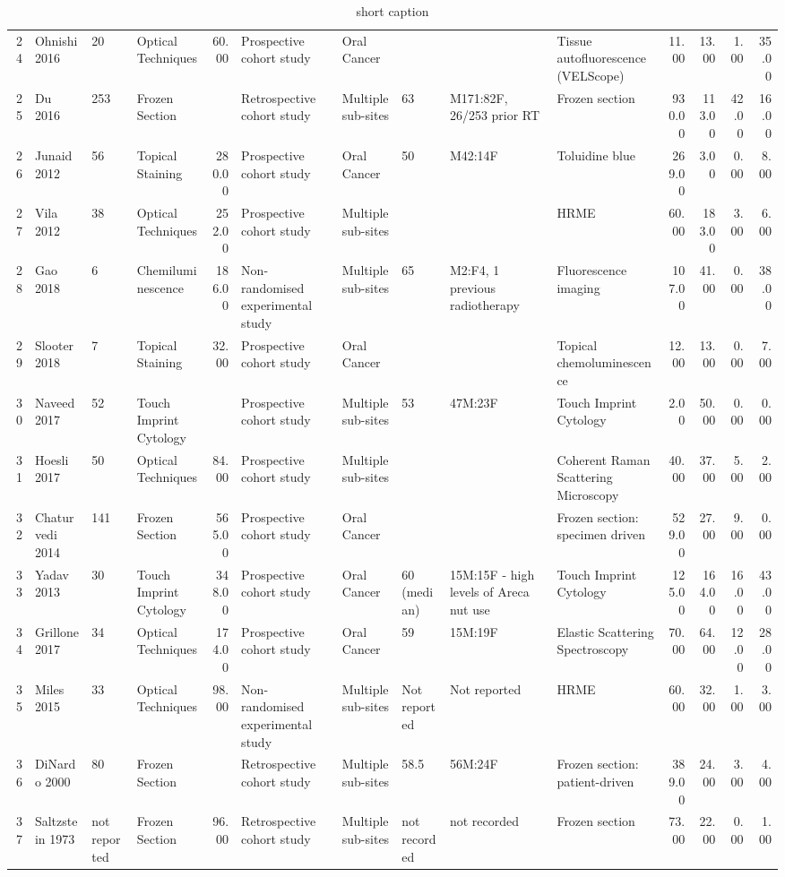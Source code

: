\begin{table}[ht]
\begin{tabular}{rlllrlllllrrrr}
  24 & Ohnishi 2016 & 20 & Optical Techniques & 60.00 & Prospective cohort study & Oral Cancer &  &  & Tissue autofluorescence (VELScope) & 11.00 & 13.00 & 1.00 & 35.00 \\ 
  25 & Du 2016 & 253 & Frozen Section &  & Retrospective cohort study & Multiple sub-sites & 63 & M171:82F, 26/253 prior RT & Frozen section & 930.00 & 113.00 & 42.00 & 16.00 \\ 
  26 & Junaid 2012 & 56 & Topical Staining & 280.00 & Prospective cohort study & Oral Cancer & 50 & M42:14F & Toluidine blue & 269.00 & 3.00 & 0.00 & 8.00 \\ 
  27 & Vila 2012 & 38 & Optical Techniques & 252.00 & Prospective cohort study & Multiple sub-sites &  &  & HRME & 60.00 & 183.00 & 3.00 & 6.00 \\ 
  28 & Gao 2018 & 6 & Chemiluminescence & 186.00 & Non-randomised experimental study & Multiple sub-sites & 65 & M2:F4, 1 previous radiotherapy & Fluorescence imaging & 107.00 & 41.00 & 0.00 & 38.00 \\ 
  29 & Slooter 2018 & 7 & Topical Staining & 32.00 & Prospective cohort study & Oral Cancer &  &  & Topical chemoluminescence & 12.00 & 13.00 & 0.00 & 7.00 \\ 
  30 & Naveed 2017 & 52 & Touch Imprint Cytology &  & Prospective cohort study & Multiple sub-sites & 53 & 47M:23F & Touch Imprint Cytology & 2.00 & 50.00 & 0.00 & 0.00 \\ 
  31 & Hoesli 2017 & 50 & Optical Techniques & 84.00 & Prospective cohort study & Multiple sub-sites &  &  & Coherent Raman Scattering Microscopy & 40.00 & 37.00 & 5.00 & 2.00 \\ 
  32 & Chaturvedi 2014 & 141 & Frozen Section & 565.00 & Prospective cohort study & Oral Cancer &  &  & Frozen section: specimen driven & 529.00 & 27.00 & 9.00 & 0.00 \\ 
  33 & Yadav 2013 & 30 & Touch Imprint Cytology & 348.00 & Prospective cohort study & Oral Cancer & 60 (median) & 15M:15F - high levels of Areca nut use & Touch Imprint Cytology & 125.00 & 164.00 & 16.00 & 43.00 \\ 
  34 & Grillone 2017 & 34 & Optical Techniques & 174.00 & Prospective cohort study & Oral Cancer & 59 & 15M:19F & Elastic Scattering Spectroscopy & 70.00 & 64.00 & 12.00 & 28.00 \\ 
  35 & Miles 2015 & 33 & Optical Techniques & 98.00 & Non-randomised experimental study & Multiple sub-sites & Not reported & Not reported & HRME & 60.00 & 32.00 & 1.00 & 3.00 \\ 
  36 & DiNardo 2000 & 80 & Frozen Section &  & Retrospective cohort study & Multiple sub-sites & 58.5 & 56M:24F & Frozen section: patient-driven & 389.00 & 24.00 & 3.00 & 4.00 \\ 
  37 & Saltzstein 1973 & not reported & Frozen Section & 96.00 & Retrospective cohort study & Multiple sub-sites & not recorded & not recorded & Frozen section & 73.00 & 22.00 & 0.00 & 1.00 \\ 
   \hline
\end{tabular}
\endgroup
\caption[full caption]{short caption} 
\label{tab:study_details}
\end{table}
